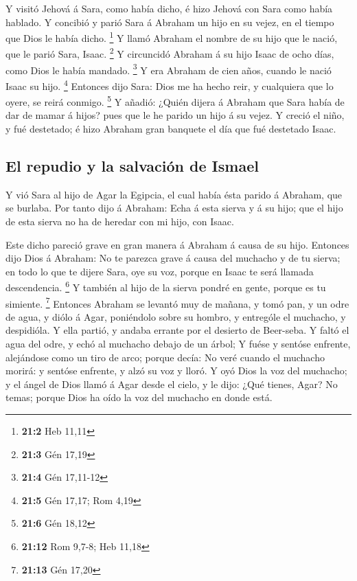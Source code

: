  Y visitó Jehová á Sara, como había dicho, é hizo Jehová
con Sara como había hablado.  Y concibió y parió Sara á
Abraham un hijo en su vejez, en el tiempo que Dios le había dicho.
\footnote{\textbf{21:2} Heb 11,11}  Y llamó Abraham el
nombre de su hijo que le nació, que le parió Sara, Isaac. \footnote{\textbf{21:3}
  Gén 17,19}  Y circuncidó Abraham á su hijo Isaac de ocho
días, como Dios le había mandado. \footnote{\textbf{21:4} Gén 17,11-12}
 Y era Abraham de cien años, cuando le nació Isaac su
hijo. \footnote{\textbf{21:5} Gén 17,17; Rom 4,19} 
Entonces dijo Sara: Dios me ha hecho reir, y cualquiera que lo oyere, se
reirá conmigo. \footnote{\textbf{21:6} Gén 18,12}  Y
añadió: ¿Quién dijera á Abraham que Sara había de dar de mamar á hijos?
pues que le he parido un hijo á su vejez.  Y creció el
niño, y fué destetado; é hizo Abraham gran banquete el día que fué
destetado Isaac.

\hypertarget{el-repudio-y-la-salvaciuxf3n-de-ismael}{%
\subsection{El repudio y la salvación de
Ismael}\label{el-repudio-y-la-salvaciuxf3n-de-ismael}}

 Y vió Sara al hijo de Agar la Egipcia, el cual había ésta
parido á Abraham, que se burlaba.  Por tanto dijo á
Abraham: Echa á esta sierva y á su hijo; que el hijo de esta sierva no
ha de heredar con mi hijo, con Isaac.

 Este dicho pareció grave en gran manera á Abraham á
causa de su hijo.  Entonces dijo Dios á Abraham: No te
parezca grave á causa del muchacho y de tu sierva; en todo lo que te
dijere Sara, oye su voz, porque en Isaac te será llamada descendencia.
\footnote{\textbf{21:12} Rom 9,7-8; Heb 11,18}  Y también
al hijo de la sierva pondré en gente, porque es tu simiente. \footnote{\textbf{21:13}
  Gén 17,20}  Entonces Abraham se levantó muy de mañana,
y tomó pan, y un odre de agua, y diólo á Agar, poniéndolo sobre su
hombro, y entrególe el muchacho, y despidióla. Y ella partió, y andaba
errante por el desierto de Beer-seba.  Y faltó el agua
del odre, y echó al muchacho debajo de un árbol;  Y fuése
y sentóse enfrente, alejándose como un tiro de arco; porque decía: No
veré cuando el muchacho morirá: y sentóse enfrente, y alzó su voz y
lloró.  Y oyó Dios la voz del muchacho; y el ángel de
Dios llamó á Agar desde el cielo, y le dijo: ¿Qué tienes, Agar? No
temas; porque Dios ha oído la voz del muchacho en donde está.

